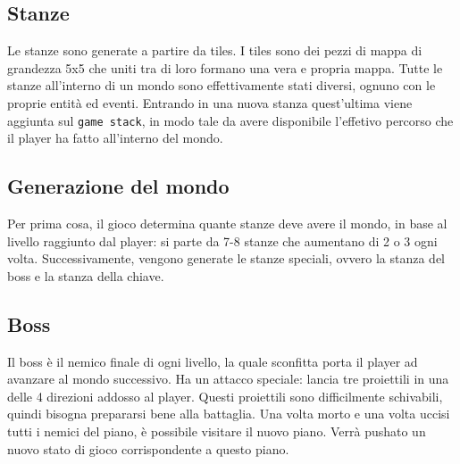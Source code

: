 \documentclass{article}
\begin{document}
\subsection{Stanze}
Le stanze sono generate a partire da tiles.
I tiles sono dei pezzi di mappa di grandezza 5x5 che uniti tra di loro formano una vera e propria mappa.
Tutte le stanze all'interno di un mondo sono effettivamente stati diversi, ognuno con le proprie entità ed eventi. Entrando in una nuova stanza quest'ultima viene aggiunta sul \verb|game stack|, in modo tale da avere disponibile l'effetivo percorso che il player ha fatto all'interno del mondo.

\subsection{Generazione del mondo}
Per prima cosa, il gioco determina quante stanze deve avere il mondo, in base al livello raggiunto dal player: si parte da 7-8 stanze che aumentano di 2 o 3 ogni volta.
Successivamente, vengono generate le stanze speciali, ovvero la stanza del boss e la stanza della chiave.

\subsection{Boss}
Il boss è il nemico finale di ogni livello, la quale sconfitta porta il player ad avanzare al mondo successivo.
Ha un attacco speciale: lancia tre proiettili in una delle 4 direzioni addosso al player. Questi proiettili sono difficilmente schivabili, quindi bisogna prepararsi bene alla battaglia.
Una volta morto e una volta uccisi tutti i nemici del piano, è possibile visitare il nuovo piano.
Verrà pushato un nuovo stato di gioco corrispondente a questo piano.
\end{document}
